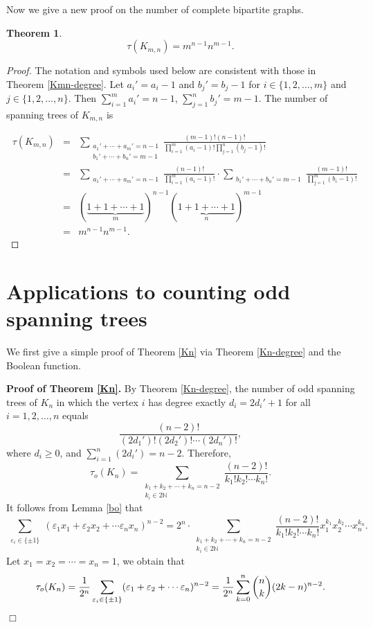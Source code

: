 \documentclass[10pt,a4paper]{article}
\newtheorem{theorem}{Theorem}[section]
\newtheorem{false statement}{False statement}
\theoremstyle{definition}
\begin{document}
Now we give a new proof on the number of complete bipartite graphs.

\begin{theorem}\cite{FS}
$$\tau(K_{m,n})=m^{n-1}n^{m-1}.$$
\end{theorem}

\begin{proof}
The notation and symbols used below are consistent with those in Theorem \ref{Kmn-degree}. 
Let $a_i'=a_i-1$ and $b_j'=b_j-1$ for $i\in\{1,2,\dots,m\}$ and $j\in\{1,2,\dots,n\}$. 
Then $\sum_{i=1}^{m}a_i'=n-1$, $\sum_{j=1}^{n}b_j'=m-1$. The number of spanning trees of $K_{m,n}$ is
  
\begin{eqnarray*}
\ \tau(K_{m,n}) & = & \sum_{\substack{a_1'+\cdots+a_m'=n-1\\b_1'+\cdots+b_n'=m-1}}\frac{(m-1)!(n-1)!}{\prod_{i=1}^{m}(a_i-1)!\prod_{j=1}^{n}(b_j-1)!} \\
& = & \sum_{\substack{a_1'+\cdots+a_m'=n-1}}\frac{(n-1)!}{\prod_{i=1}^{m}(a_i-1)!}
      \cdot\sum_{\substack{b_1'+\cdots+b_n'=m-1}}\frac{(m-1)!}{\prod_{j=1}^{m}(b_i-1)!} \\
& = & (\underbrace{1+1+\cdots+1}_{m})^{n-1}(\underbrace{1+1+\cdots+1}_{n})^{m-1} \\
& = & m^{n-1}n^{m-1}.
\end{eqnarray*}


  \end{proof}

\section{Applications to counting odd spanning trees}\label{appl}

We first give a simple proof of Theorem \ref{Kn} via Theorem \ref{Kn-degree} and the Boolean function.

\noindent
{\bf Proof of Theorem \ref{Kn}.}
By Theorem \ref{Kn-degree}, the number of odd spanning trees of $K_n$ in which 
the vertex $i$ has degree exactly $d_i=2d_i'+1$ for all $i=1,2,\dots,n$ equals$$
	\dfrac{(n-2)!}{(2d_1')!(2d_2')!\cdots(2d_n')!},$$
	where $d_i\geq0$, and $\sum_{i=1}^{n}(2d_i')=n-2$.
Therefore, 
$$\tau_o(K_n)=\sum_{\substack{k_1+k_2+\cdots+k_n=n-2\\k_i\in 2\mathbb{N} }}\frac{(n-2)!}{k_1!k_2!\cdots k_n!}.$$
It follows from Lemma \ref{bo} that
$$
	\sum_{\substack{\varepsilon_i \in \{\pm1\}}}(\varepsilon_1x_1+\varepsilon_2x_2+\cdots\varepsilon_nx_n)^{n-2}=	2^n\cdot\sum_{\substack{k_1+k_2+\cdots+k_n=n-2\\k_i\in 2\mathbb{N} }}\frac{(n-2)!}{k_1!k_2!\cdots k_n!}x_1^{k_1}x_2^{k_2}\cdots x_n^{k_n}.
	$$
Let $x_1=x_2=\cdots=x_n=1$, we obtain that
       $$
		\tau_o(K_n)=\frac{1}{2^n}	\sum_{\substack{\varepsilon_i \in \{\pm1\}}}(\varepsilon_1+\varepsilon_2+\cdots\varepsilon_n)^{n-2}\\
		=\frac{1}{2^n}\sum_{k=0}^{n}\binom{n}{k}(2k-n)^{n-2}.
	  $$
{\hfill$\Box$}
\end{document}
